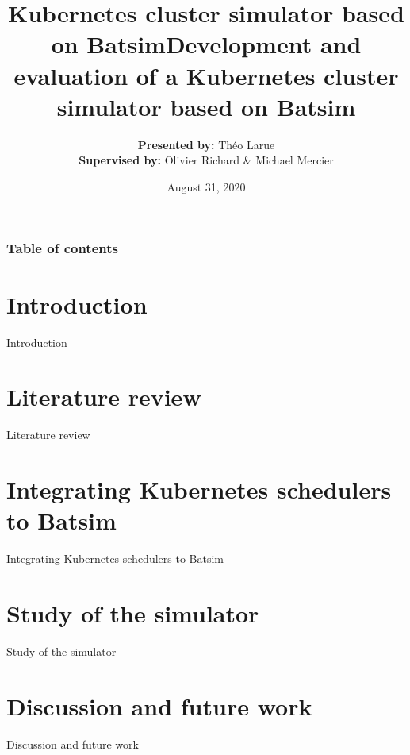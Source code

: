 \documentclass[12pt, aspectratio=43]{beamer}
\title{Kubernetes cluster simulator based on Batsim}
\title{Development and evaluation of a Kubernetes cluster simulator based on
Batsim}
\author{\textbf{Presented by:} Théo Larue\\\textbf{Supervised by:} Olivier Richard \& Michael Mercier}
\date{August 31, 2020}
\institute[Théo LARUE]{Université Grenoble Alpes}
\begin{document}
\frame{\titlepage}

\begin{frame}\frametitle{Table of contents}\tableofcontents
\end{frame}

\section{Introduction}
\begin{frame}{Introduction}
\end{frame}

\section{Literature review}
\begin{frame}{Literature review}
\end{frame}

\section{Integrating Kubernetes schedulers to Batsim}
\begin{frame}{Integrating Kubernetes schedulers to Batsim}
\end{frame}

\section{Study of the simulator}
\begin{frame}{Study of the simulator}
\end{frame}

\section{Discussion and future work}
\begin{frame}{Discussion and future work}
\end{frame}
\end{document}
